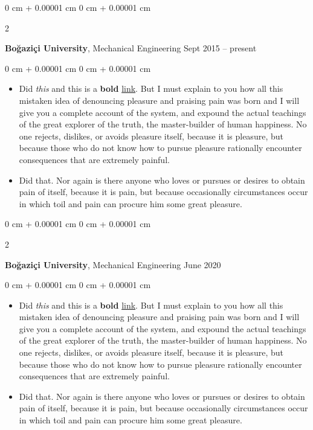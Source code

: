 \documentclass[10pt, letterpaper]{article}
\newenvironment{highlights}{
    \begin{itemize}[
        topsep=0.10 cm,
        parsep=0.10 cm,
        partopsep=0pt,
        itemsep=0pt,
        leftmargin=0 cm + 10pt
    ]
}{
    \end{itemize}
} %
\newenvironment{onecolentry}{
    \begin{adjustwidth}{
        0 cm + 0.00001 cm
    }{
        0 cm + 0.00001 cm
    }
}{
    \end{adjustwidth}
} %
\newenvironment{twocolentry}[2][]{
    \onecolentry
    \def\secondColumn{#2}
    \setcolumnwidth{\fill, 4.5 cm}
    \begin{paracol}{2}
}{
    \switchcolumn \raggedleft \secondColumn
    \end{paracol}
    \endonecolentry
} %
\begin{document}
        \vspace{0.2 cm}

        \begin{twocolentry}{
            Sept 2015 – present
        }
            \textbf{Boğaziçi University}, Mechanical Engineering\end{twocolentry}

        \vspace{0.10 cm}
        \begin{onecolentry}
            \begin{highlights}
                \item Did \textit{this} and this is a \textbf{bold} \href{https://example.com}{link}. But I must explain to you how all this mistaken idea of denouncing pleasure and praising pain was born and I will give you a complete account of the system, and expound the actual teachings of the great explorer of the truth, the master-builder of human happiness. No one rejects, dislikes, or avoids pleasure itself, because it is pleasure, but because those who do not know how to pursue pleasure rationally encounter consequences that are extremely painful.
                \item Did that. Nor again is there anyone who loves or pursues or desires to obtain pain of itself, because it is pain, but because occasionally circumstances occur in which toil and pain can procure him some great pleasure.
            \end{highlights}
        \end{onecolentry}


        \vspace{0.2 cm}

        \begin{twocolentry}{
            June 2020
        }
            \textbf{Boğaziçi University}, Mechanical Engineering\end{twocolentry}

        \vspace{0.10 cm}
        \begin{onecolentry}
            \begin{highlights}
                \item Did \textit{this} and this is a \textbf{bold} \href{https://example.com}{link}. But I must explain to you how all this mistaken idea of denouncing pleasure and praising pain was born and I will give you a complete account of the system, and expound the actual teachings of the great explorer of the truth, the master-builder of human happiness. No one rejects, dislikes, or avoids pleasure itself, because it is pleasure, but because those who do not know how to pursue pleasure rationally encounter consequences that are extremely painful.
                \item Did that. Nor again is there anyone who loves or pursues or desires to obtain pain of itself, because it is pain, but because occasionally circumstances occur in which toil and pain can procure him some great pleasure.
            \end{highlights}
        \end{onecolentry}
\end{document}
